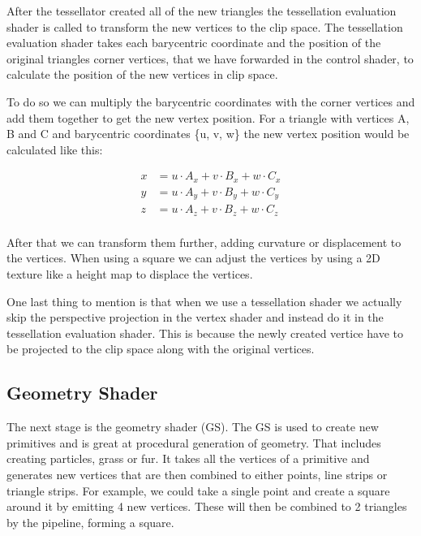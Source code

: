 \documentclass[12pt]{report} \usepackage{preamble}
\begin{document}
After the tessellator created all of the new triangles the tessellation evaluation shader
is called to transform the new vertices to the clip space.
The tessellation evaluation shader takes each barycentric coordinate
and the position of the original triangles corner vertices, that we have forwarded in
the control shader, to calculate the position of the new vertices in clip space. \cite{tessellation}

To do so we can multiply the barycentric coordinates with the corner vertices
and add them together to get the new vertex position.
For a triangle with vertices A, B and C and barycentric coordinates \{u, v, w\}
the new vertex position would be calculated like this:

\[
	\begin{aligned}
		x & = u \cdot A_x + v \cdot B_x + w \cdot C_x \\
		y & = u \cdot A_y + v \cdot B_y + w \cdot C_y \\
		z & = u \cdot A_z + v \cdot B_z + w \cdot C_z \\
	\end{aligned}
\]

After that we can transform them further, adding curvature or displacement to the vertices.
When using a square we can adjust the vertices
by using a 2D texture like a height map to displace the vertices. \cite{tessellation}

One last thing to mention is that when we use a tessellation shader
we actually skip the perspective projection in the vertex shader and
instead do it in the tessellation evaluation shader.
This is because the newly created vertice have to be projected to the clip space
along with the original vertices. \cite{tessellation}

\subsection{Geometry Shader}

The next stage is the geometry shader (GS). The GS is used to create new
primitives and is great at procedural generation of geometry.
That includes creating particles, grass or fur. It takes all the vertices of a primitive
and generates new vertices that are then combined to
either points, line strips or triangle strips.
For example, we could take a single point and create a square around it by emitting 4 new vertices.
These will then be combined to 2 triangles by the pipeline, forming a square. \cite{geometry-shader}
\end{document}
